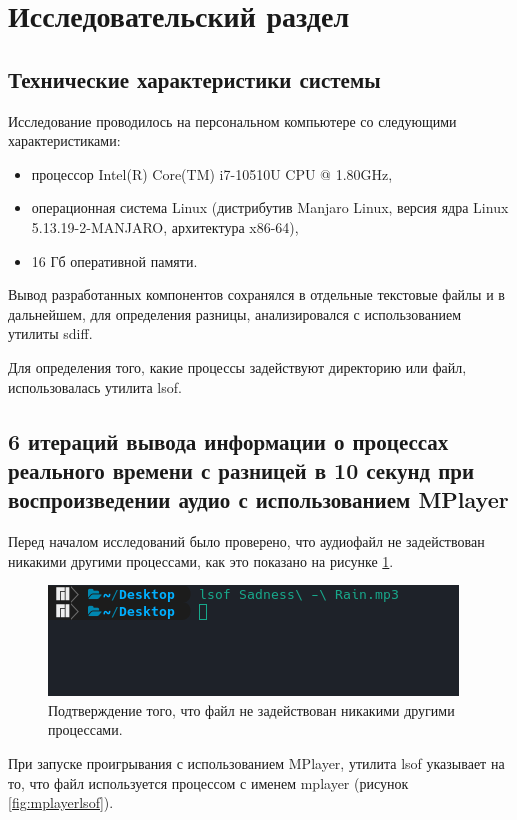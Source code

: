 \section{Исследовательский раздел}
\subsection{Технические характеристики системы}
Исследование проводилось на персональном компьютере со следующими характеристиками:

\begin{itemize}
\item процессор Intel(R) Core(TM) i7-10510U CPU @ 1.80GHz,
\item операционная система Linux (дистрибутив Manjaro Linux, версия ядра Linux 5.13.19-2-MANJARO, архитектура x86-64),
\item 16 Гб оперативной памяти.
\end{itemize}

Вывод разработанных компонентов сохранялся в отдельные текстовые файлы и в дальнейшем, для определения разницы, анализировался с использованием утилиты sdiff.

Для определения того, какие процессы задействуют директорию или файл, использовалась утилита lsof.

\subsection{6 итераций вывода информации о процессах реального времени с разницей в 10 секунд при воспроизведении аудио с использованием MPlayer}
Перед началом исследований было проверено, что аудиофайл не задействован никакими другими процессами, как это показано на рисунке \ref{fig:emptylsof}.

\begin{figure}[H]
	\centering
	\includegraphics[scale=1]{img/emptylsof.png}
	\caption{Подтверждение того, что файл не задействован никакими другими процессами.}
	\label{fig:emptylsof}
\end{figure}

При запуске проигрывания с использованием MPlayer, утилита lsof указывает на то, что файл используется процессом с именем mplayer (рисунок \ref{fig:mplayerlsof}).

